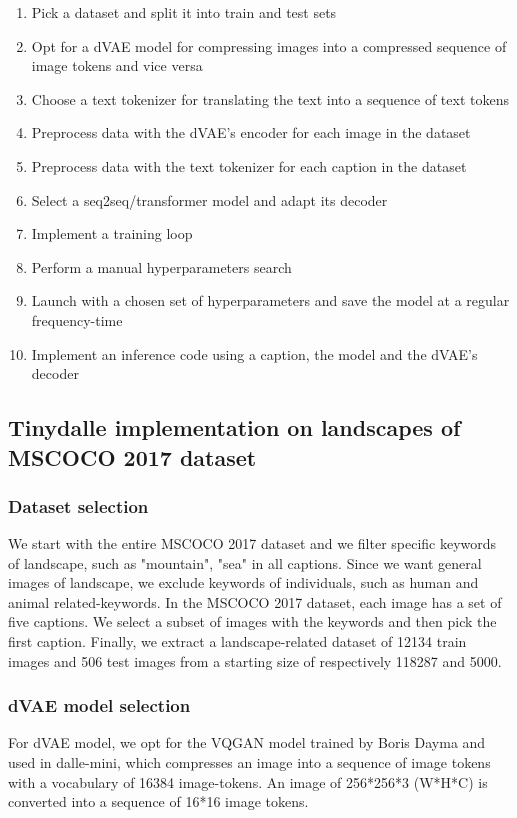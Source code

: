 \documentclass{article}
\begin{document}
\begin{enumerate}
\item Pick a dataset and split it into train and test sets
    \item Opt for a dVAE model for compressing images into a compressed sequence of image tokens and vice versa
    \item Choose a text tokenizer for translating the text into a sequence of text tokens
    \item Preprocess data with the dVAE's encoder for each image in the dataset
    \item Preprocess data with the text tokenizer for each caption in the dataset
    \item Select a seq2seq/transformer model and adapt its decoder
    \item Implement a training loop
    \item Perform a manual hyperparameters search
    \item Launch with a chosen set of hyperparameters and save the model at a regular frequency-time
    \item Implement an inference code using a caption, the model and the dVAE's decoder
\end{enumerate}

\subsection{Tinydalle implementation on landscapes of MSCOCO 2017 dataset}

\subsubsection{Dataset selection}

We start with the entire MSCOCO 2017 dataset and we filter specific keywords of landscape, such as "mountain", "sea" in all captions. Since we want general images of landscape, we exclude keywords of individuals, such as human and animal related-keywords. In the MSCOCO 2017 dataset, each image has a set of five captions. We select a subset of images with the keywords and then pick the first caption. Finally, we extract a landscape-related dataset of 12134 train images and 506 test images from a starting size of respectively 118287 and 5000.

\subsubsection{dVAE model selection}
For dVAE model, we opt for the VQGAN model trained by Boris Dayma and used in dalle-mini, which compresses an image into a sequence of image tokens with a vocabulary of 16384 image-tokens. An image of 256*256*3 (W*H*C) is converted into a sequence of 16*16 image tokens.
\end{document}

